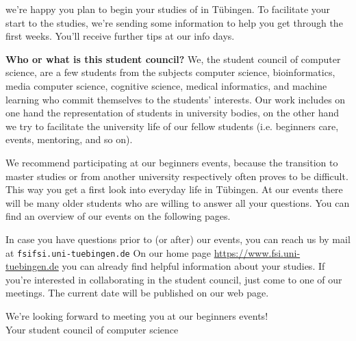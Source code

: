 we're happy you plan to begin your studies of \studiengang in Tübingen.
To facilitate your start to the studies, we're sending some information to help you get through the first weeks.
You'll receive further tips at our info days.

\textbf{Who or what is this \glqq student council\grqq?} We, the student council of computer science, are a few students from the subjects computer science, bioinformatics, media computer science, cognitive science, medical informatics, and machine learning who commit themselves to the students' interests. Our work includes on one hand the representation of students in university bodies, on the other hand we try to facilitate the university life of our fellow students (i.e. beginners care,
events, mentoring, and so on).

\ifmaster
    \ifml
We recommend participating at our beginners events, because the transition to master studies or from another university respectively often proves to be difficult. This way you get a first look into everyday life in Tübingen.
    \fi
\fi 
At our events there will be many older students who are willing to answer all your questions. You can find an overview of our events on the following pages.

In case you have questions prior to (or after) our events, you can reach us by mail at \texttt{fsi\At fsi.uni-tuebingen.de}
On our home page
\url{https://www.fsi.uni-tuebingen.de} you can already find helpful information about your studies. If you're interested in collaborating in the student council, just come to one of our meetings. The current date will be published on our web page.

We're looking forward to meeting you at our beginners events!\\
Your student council of computer science
\vfill

\noindent{}
